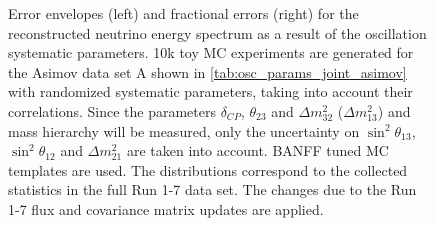 \begin{figure}[htb]
\caption {
Error envelopes (left) and fractional errors (right) for the reconstructed neutrino energy spectrum
as a result of the oscillation systematic parameters.
10k toy MC experiments are generated for the Asimov data set A shown in \cref{tab:osc_params_joint_asimov}
with randomized systematic parameters, taking into account their correlations.
Since the parameters $\delta_{CP}$, $\theta_{23}$ and $\Delta m^2_{32}$ ($\Delta m^2_{13}$) and mass hierarchy
will be measured,
only the uncertainty on 
$\sin^2 \theta_{13}$,
$\sin^2 \theta_{12}$
and 
$\Delta m^2_{21}$ 
are taken into account.
BANFF tuned MC templates are used. 
The distributions correspond to the collected statistics in the full Run 1-7 data set.
The changes due to the Run 1-7 flux and covariance matrix updates are applied.
}
\label{fig:Osc_envelope_Asimov_A_run17}
\end{figure}


